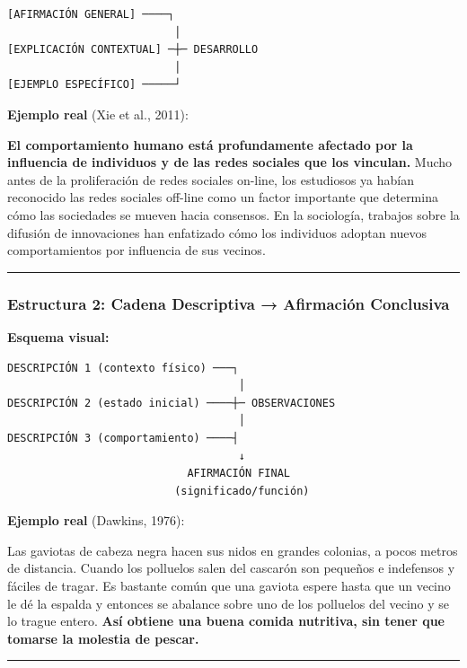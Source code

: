 \documentclass[
  11pt,
]{beaner}
\begin{document}
\begin{verbatim}
[AFIRMACIÓN GENERAL] ────┐
                          │
[EXPLICACIÓN CONTEXTUAL] ─┼─ DESARROLLO
                          │
[EJEMPLO ESPECÍFICO] ─────┘
\end{verbatim}

\textbf{Ejemplo real} (Xie et al., 2011):

{\textbf{El comportamiento humano está profundamente afectado por la
influencia de individuos y de las redes sociales que los vinculan.}}
Mucho antes de la proliferación de redes sociales on-line, los
estudiosos ya habían reconocido las redes sociales off-line como un
factor importante que determina cómo las sociedades se mueven hacia
consensos. {En la sociología, trabajos sobre la difusión de innovaciones
han enfatizado cómo los individuos adoptan nuevos comportamientos por
influencia de sus vecinos.}

\begin{center}\rule{0.5\linewidth}{0.5pt}\end{center}

\subsubsection{Estructura 2: Cadena Descriptiva → Afirmación
Conclusiva}\label{estructura-2-cadena-descriptiva-afirmaciuxf3n-conclusiva}

\textbf{Esquema visual:}

\begin{verbatim}
DESCRIPCIÓN 1 (contexto físico) ───┐
                                    │
DESCRIPCIÓN 2 (estado inicial) ────┼─ OBSERVACIONES
                                    │
DESCRIPCIÓN 3 (comportamiento) ────┤
                                    ↓
                            AFIRMACIÓN FINAL
                          (significado/función)
\end{verbatim}

\textbf{Ejemplo real} (Dawkins, 1976):

Las gaviotas de cabeza negra hacen sus nidos en grandes colonias, a
pocos metros de distancia. Cuando los polluelos salen del cascarón son
pequeños e indefensos y fáciles de tragar. Es bastante común que una
gaviota espere hasta que un vecino le dé la espalda y entonces se
abalance sobre uno de los polluelos del vecino y se lo trague entero.
{\textbf{Así obtiene una buena comida nutritiva, sin tener que tomarse
la molestia de pescar.}}

\begin{center}\rule{0.5\linewidth}{0.5pt}\end{center}
\end{document}
